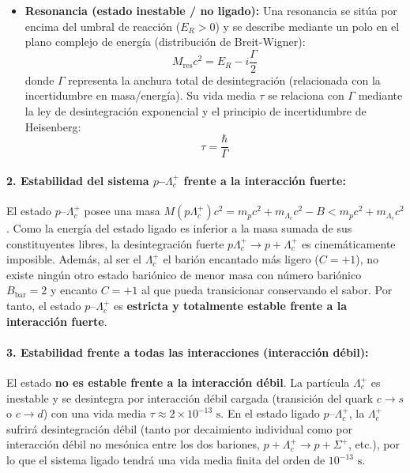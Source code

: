 \begin{problema}
\begin{itemize}
    \item \textbf{Resonancia (estado inestable / no ligado):} Una resonancia se sitúa por encima del umbral de reacción ($E_R > 0$) y se describe mediante un polo en el plano complejo de energía (distribución de Breit-Wigner):
    \begin{equation*}
    M_{\text{res}} c^2 = E_R - i \frac{\Gamma}{2}
    \end{equation*}
    donde $\Gamma$ representa la anchura total de desintegración (relacionada con la incertidumbre en masa/energía). Su vida media $\tau$ se relaciona con $\Gamma$ mediante la ley de desintegración exponencial y el principio de incertidumbre de Heisenberg:
    \begin{equation*}
    \tau = \frac{\hbar}{\Gamma}
    \end{equation*}
\end{itemize}

\paragraph{2. Estabilidad del sistema $p$--$\Lambda_c^+$ frente a la interacción fuerte:}
El estado $p$--$\Lambda_c^+$ posee una masa $M(p\Lambda_c^+) c^2 = m_p c^2 + m_{\Lambda_c} c^2 - B < m_p c^2 + m_{\Lambda_c} c^2$. Como la energía del estado ligado es inferior a la masa sumada de sus constituyentes libres, la desintegración fuerte $p\Lambda_c^+ \to p + \Lambda_c^+$ es cinemáticamente imposible. Además, al ser el $\Lambda_c^+$ el barión encantado más ligero ($C=+1$), no existe ningún otro estado bariónico de menor masa con número bariónico $B_{\text{bar}} = 2$ y encanto $C=+1$ al que pueda transicionar conservando el sabor. Por tanto, el estado $p$--$\Lambda_c^+$ es \textbf{estricta y totalmente estable frente a la interacción fuerte}.

\paragraph{3. Estabilidad frente a todas las interacciones (interacción débil):}
El estado \textbf{no es estable frente a la interacción débil}. La partícula $\Lambda_c^+$ es inestable y se desintegra por interacción débil cargada (transición del quark $c \to s$ o $c \to d$) con una vida media $\tau \approx 2 \times 10^{-13}\text{ s}$. En el estado ligado $p$--$\Lambda_c^+$, la $\Lambda_c^+$ sufrirá desintegración débil (tanto por decaimiento individual como por interacción débil no mesónica entre los dos bariones, $p + \Lambda_c^+ \to p + \Sigma^+$, etc.), por lo que el sistema ligado tendrá una vida media finita del orden de $10^{-13}\text{ s}$.


\end{problema}
